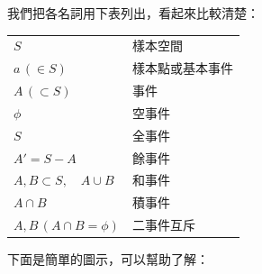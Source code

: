 我們把各名詞用下表列出，看起來比較清楚：

\begin{center}
\renewcommand{\arraystretch}{1.2}
\begin{tabular}{l|l}
\hline
$S$ & 樣本空間 \\
$a\,(\in S)$ & 樣本點或基本事件 \\
$A\,(\subset S)$ & 事件 \\
$\phi$ & 空事件 \\
$S$ & 全事件 \\
$A'=S-A$ & 餘事件 \\
$A, B \subset S,\quad A \cup B$ & 和事件 \\
$A \cap B$ & 積事件 \\
$A, B\,(A \cap B = \phi)$ & 二事件互斥 \\
\hline
\end{tabular}
\end{center}

下面是簡單的圖示，可以幫助了解：

